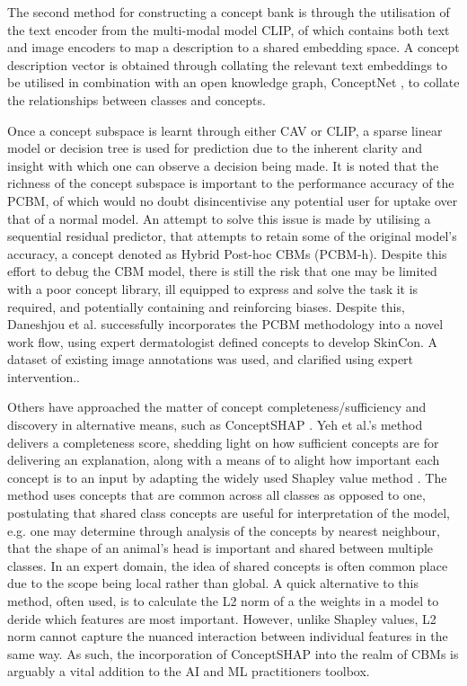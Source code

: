 The second method for constructing a concept bank is through the utilisation of the text encoder from the multi-modal model CLIP, of which contains both text and image encoders to map a description to a shared embedding space. A concept description vector is obtained through collating the relevant text embeddings to be utilised in combination with an open knowledge graph, ConceptNet \cite{speerConceptNetOpenMultilingual2017}, to collate the relationships between classes and concepts. 

Once a concept subspace is learnt through either CAV or CLIP, a sparse linear model or decision tree is used for prediction due to the inherent clarity and insight with which one can observe a decision being made. It is noted that the richness of the concept subspace is important to the performance accuracy of the PCBM, of which would no doubt disincentivise any potential user for uptake over that of a normal model. An attempt to solve this issue is made by utilising a sequential residual predictor, that attempts to retain some of the original model’s accuracy, a concept denoted as Hybrid Post-hoc CBMs (PCBM-h). Despite this effort to debug the CBM model, there is still the  risk that one may be limited with a poor concept library, ill equipped to express and solve the task it is required, and potentially containing and reinforcing biases. Despite this, Daneshjou et al. \cite{daneshjouSkinConSkinDisease2022} successfully incorporates the PCBM methodology into a novel work flow, using expert dermatologist defined concepts to develop SkinCon. A dataset of existing image annotations was used, and clarified using expert intervention..

Others have approached the matter of concept completeness/sufficiency and discovery in alternative means, such as ConceptSHAP \cite{yehCompletenessawareConceptBasedExplanations2019}. Yeh et al.’s method delivers a completeness score, shedding light on how sufficient concepts are for delivering an explanation, along with a means of to alight how important each concept is to an input by adapting the widely used Shapley value method \cite{shapley17ValueNPerson1953}. The method uses concepts that are common across all classes as opposed to one, postulating that shared class concepts are useful for interpretation of the model, e.g. one may determine through analysis of the concepts by nearest neighbour, that the shape of an animal’s head is important and shared between multiple classes. In an expert domain, the idea of shared concepts is often common place due to the scope being local rather than global. A quick alternative to this method, often used, is to calculate the L2 norm of a the weights in a model to deride which features are most important. However, unlike Shapley values, L2 norm cannot capture the nuanced interaction between individual features in the same way. As such, the incorporation of ConceptSHAP into the realm of CBMs is arguably a vital addition to the AI and ML practitioners toolbox.

